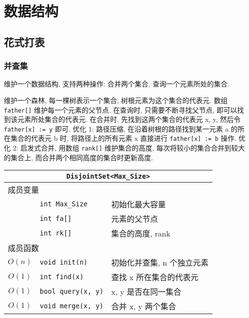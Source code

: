 \chapter{数据结构}

\section{花式打表}\small


	\subsection{并查集}\small
维护一个数据结构, 支持两种操作: 合并两个集合, 查询一个元素所处的集合.

维护一个森林, 每一棵树表示一个集合, 树根元素为这个集合的代表元. 数组
{\tt father[]} 维护每一个元素的父节点. 在查询时, 只需要不断寻找父节点, 即可以找
到该元素所处集合的代表元. 在合并时, 先找到这两个集合的代表元 x, y, 然后令
{\tt father[x] := y} 即可. 优化 1: 路径压缩, 在沿着树根的路径找到某一元素 a 的所
在集合的代表元 b 时, 将路径上的所有元素 x 直接进行 {\tt father[x] := b} 操作. 优
化 2: 启发式合并, 用数组 {\tt rank[]} 维护集合的高度, 每次将较小的集合合并到较大
的集合上, 而合并两个相同高度的集合时更新高度.

\begin{longtable}{c|l|l}
\multicolumn{3}{c}{{\tt DisjointSet<Max\_Size>}} \\ \hline\hline
\multicolumn{3}{l}{成员变量} \\ \hline
& \verb`int Max_Size` & 初始化最大容量 \\
& \verb`int fa[]` & 元素的父节点 \\
& \verb`int rk[]` & 集合的高度, rank \\
\hline
\multicolumn{3}{l}{成员函数} \\ \hline
$O(n)$ & \verb`void init(n)` & 初始化并查集, n 个独立元素 \\
$O(1)$ & \verb`int find(x)` & 查找 x 所在集合的代表元 \\
$O(1)$ & \verb`bool query(x, y)` & x, y 是否在同一集合 \\
$O(1)$ & \verb`void merge(x, y)` & 合并 x, y 两个集合 \\
\hline\hline
\end{longtable}




